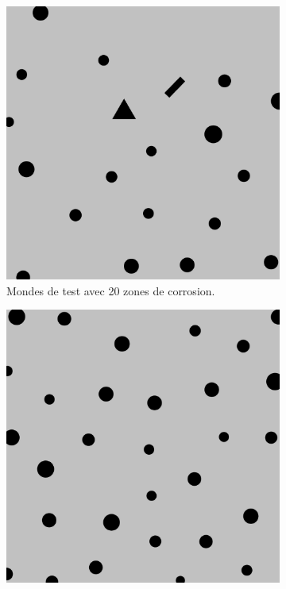 \documentclass[francais,RandD]{rapportPFE}
\begin{document}
\begin{figure}[H]
\begin{subfigure}[t]{0.15\linewidth}
				\includegraphics[width=\linewidth]{graphics/test_model_20_1.png}
				\caption{Mondes de test avec 20 zones de corrosion.}
				\label{fig:test_model_20_1}
			\end{subfigure}
			\hfill
			\begin{subfigure}[t]{0.15\linewidth}
				\centering
				\includegraphics[width=\linewidth]{graphics/test_model_30_1.png}

\end{subfigure}
\end{figure}
\end{document}
